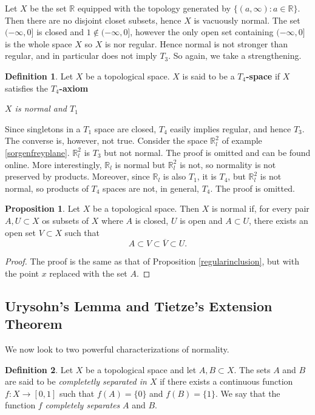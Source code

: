 \documentclass{book}
\theoremstyle{definition}
\newtheorem{proposition}{Proposition}[section]
\newtheorem{definition}{Definition}[section]
\theoremstyle{remark}
\newcommand{\R}{\mathbb{R}}
\begin{document}
Let $X$ be the set $\R$ equipped with the topology generated by $\{(a,\infty):a\in\R\}$. Then there are no disjoint closet subsets, hence $X$ is vacuously normal. The set $(-\infty,0]$ is closed and $1\notin(-\infty,0]$, however the only open set containing $(-\infty,0]$ is the whole space $X$ so $X$ is nor regular. Hence normal is not stronger than regular, and in particular does not imply $T_3$. So again, we take a strengthening.

\begin{definition}
Let $X$ be a topological space. $X$ is said to be a \textbf{$T_4$-space} if $X$ satisfies the \textbf{$T_4$-axiom}
\begin{center}
    \textit{$X$ is normal and $T_1$}
\end{center}
\end{definition}

Since singletons in a $T_1$ space are closed, $T_4$ easily implies regular, and hence $T_3$. The converse is, however, not true. Consider the space $\R_l^2$ of example \ref{sorgenfreyplane}. $\R_l^2$ is $T_3$ but not normal. The proof is omitted and can be found online. More interestingly, $\R_l$ is normal but $\R_l^2$ is not, so normality is not preserved by products. Moreover, since $\R_l$ is also $T_1$, it is $T_4$, but $\R_l^2$ is not normal, so products of $T_4$ spaces are not, in general, $T_4$. The proof is omitted.

\begin{proposition}
Let $X$ be a topological space. Then $X$ is normal if, for every pair $A,U\subset X$ os subsets of $X$ where $A$ is closed, $U$ is open and $A\subset U$, there exists an open set $V\subset X$ such that
$$A\subset V\subset\overline V\subset U.$$
\end{proposition}
\begin{proof}
The proof is the same as that of Proposition \ref{regularinclusion}, but with the point $x$ replaced with the set $A$.
\end{proof}

\subsection{Urysohn's Lemma and Tietze's Extension Theorem}
We now look to two powerful characterizations of normality.

\begin{definition}
Let $X$ be a topological space and let $A,B\subset X$. The sets $A$ and $B$ are said to be \textit{completetly separated in $X$} if there exists a continuous function $f:X\to[0,1]$ such that $f(A)=\{0\}$ and $f(B)=\{1\}$. We say that the function $f$ \textit{completely separates} $A$ and $B$.
\end{definition}
\end{document}
